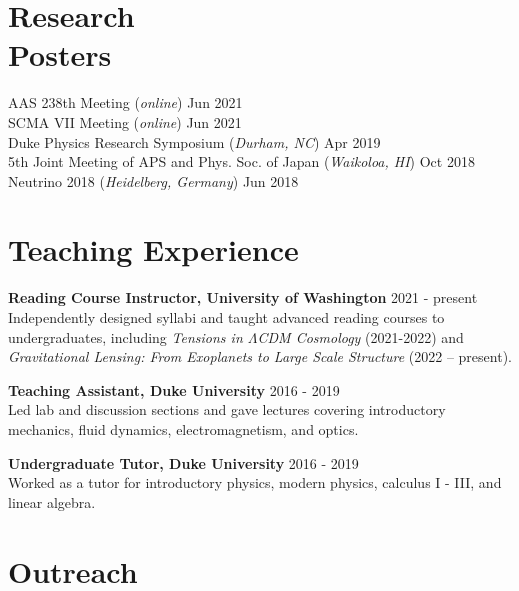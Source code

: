\documentclass[margin, 11pt]{res}
\begin{document}
\begin{resume}
\section{Research \\Posters}

AAS 238th Meeting (\textit{online}) \hfill Jun 2021 \\
SCMA VII Meeting (\textit{online}) \hfill Jun 2021 \\
Duke Physics Research Symposium (\textit{Durham, NC}) \hfill Apr 2019 \\
5th Joint Meeting of APS and Phys. Soc. of Japan (\textit{Waikoloa, HI}) \hfill Oct 2018 \\
Neutrino 2018 (\textit{Heidelberg, Germany}) \hfill Jun 2018 \\

\section{Teaching Experience}

\textbf{Reading Course Instructor, University of Washington} \hfill 2021 - present \\
Independently designed syllabi and taught advanced reading courses to undergraduates, including \textit{Tensions in $\Lambda$CDM Cosmology} (2021-2022) and \textit{Gravitational Lensing: From Exoplanets to Large Scale Structure} (2022 -- present).

\textbf{Teaching Assistant, Duke University} \hfill 2016 - 2019 \\
Led lab and discussion sections and gave lectures covering introductory mechanics, fluid dynamics, electromagnetism, and optics.

\textbf{Undergraduate Tutor, Duke University} \hfill 2016 - 2019 \\
Worked as a tutor for introductory physics, modern physics, calculus I - III, and linear algebra.

\section{Outreach}


\end{resume}
\end{document}
